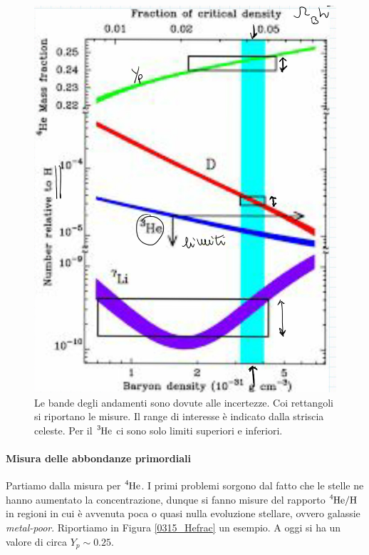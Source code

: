 \begin{figure}[!h]
    \centering
    \includegraphics[scale=0.2]{Immagini/0315_massfraction2.png}
    \caption{Le bande degli andamenti sono dovute alle incertezze. Coi rettangoli si riportano le misure. Il range di interesse è indicato dalla striscia celeste. Per il $\ce{^3He}$ ci sono solo limiti superiori e inferiori.}
    \label{0315_mfrac2}
\end{figure}
\newpage
\paragraph{Misura delle abbondanze primordiali} Partiamo dalla misura per $\ce{^4He}$. I primi problemi sorgono dal fatto che le stelle ne hanno aumentato la concentrazione, dunque si fanno misure del rapporto $\ce{^4He}/\ce{H}$ in regioni in cui è avvenuta poca o quasi nulla evoluzione stellare, ovvero galassie \textit{metal-poor}. Riportiamo in Figura \ref{0315_Hefrac} un esempio. A oggi si ha un valore di circa $Y_p \sim 0.25$.

